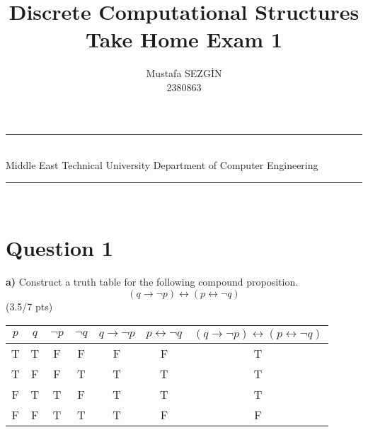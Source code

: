 \documentclass[a4paper,12pt]{article}
\title{Discrete Computational Structures \\ Take Home Exam 1}
\author{Mustafa SEZGİN \\ 2380863} %
\date{} %
\newcommand{\HRule}{\rule{\linewidth}{1mm}}
\newcommand\tab[1][1cm]{\hspace*{#1}}
\begin{document}
\HRule\\
Middle East Technical University \hfill Department of Computer Engineering
{\let\newpage\relax\maketitle}
\HRule\\
\vspace{1cm}


\section*{Question 1 \hfill {}}

\tab \textbf{a)} Construct a truth table for the following compound proposition.
\begin{equation*}
    (q \rightarrow \neg p)\leftrightarrow (p \leftrightarrow \neg q)
\end{equation*} 
\hfill \small{(3.5/7 pts)} \\
\begin{tcolorbox}
\centering
\begin{tabular}{c|c|c|c|c|c|c}
    $p$ & $q$ & $\neg p$ & $\neg q$ & $q \rightarrow \neg p$ & $p \leftrightarrow \neg q$ & $(q \rightarrow \neg p) \leftrightarrow (p \leftrightarrow \neg q)$ \\
    \hline
    T & T & F & F & F & F & T \\
    T & F & F & T & T & T & T \\
    F & T & T & F & T & T & T \\
    F & F & T & T & T & F & F
\end{tabular}
\end{tcolorbox}
\end{document}
